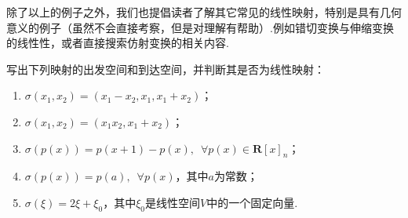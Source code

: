 除了以上的例子之外，我们也提倡读者了解其它常见的线性映射，特别是具有几何意义的例子（虽然不会直接考察，但是对理解有帮助）.例如错切变换与伸缩变换的线性性，或者直接搜索仿射变换的相关内容.

\begin{example}{}{}
    写出下列映射的出发空间和到达空间，并判断其是否为线性映射：
    \begin{enumerate}
        \item $\sigma(x_1,x_2)=(x_1-x_2,x_1,x_1+x_2)$；

        \item $\sigma(x_1,x_2)=(x_1x_2,x_1+x_2)$；

        \item $\sigma(p(x))=p(x+1)-p(x),\enspace\forall p(x) \in \mathbf{R}[x]_n$；

        \item $\sigma(p(x))=p(a),\enspace\forall p(x)$，其中$a$为常数；

        \item $\sigma(\xi)=2\xi+\xi_0$，其中$\xi_0$是线性空间$V$中的一个固定向量.
    \end{enumerate}
\end{example}

